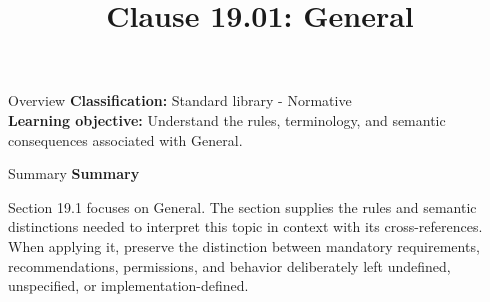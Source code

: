 \documentclass[10pt,letterpaper]{article}
\title{Clause 19.01: General}
\author{}
\date{}
\begin{document}
\maketitle
\begin{CornellOverviewBox}{Overview}
\textbf{Classification:} Standard library - Normative\\[2pt]
\textbf{Learning objective:} Understand the rules, terminology, and semantic consequences associated with General.
\end{CornellOverviewBox}\begin{CornellSummaryBox}{Summary}
{\sffamily\bfseries\color{Accent} Summary}\par\vspace{3pt}Section 19.1 focuses on General. The section supplies the rules and semantic distinctions needed to interpret this topic in context with its cross-references. When applying it, preserve the distinction between mandatory requirements, recommendations, permissions, and behavior deliberately left undefined, unspecified, or implementation-defined.
\end{CornellSummaryBox}
\end{document}

